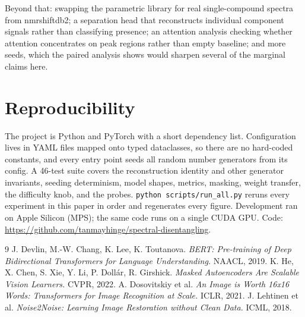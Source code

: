 \documentclass[11pt]{article}
\begin{document}
Beyond that: swapping the parametric library for real single-compound spectra from
nmrshiftdb2; a separation head that reconstructs individual component signals rather than
classifying presence; an attention analysis checking whether attention concentrates on peak
regions rather than empty baseline; and more seeds, which the paired analysis shows would
sharpen several of the marginal claims here.

\section{Reproducibility}

The project is Python and PyTorch with a short dependency list. Configuration lives in YAML
files mapped onto typed dataclasses, so there are no hard-coded constants, and every entry
point seeds all random number generators from its config. A 46-test suite covers the
reconstruction identity and other generator invariants, seeding determinism, model shapes,
metrics, masking, weight transfer, the difficulty knob, and the probes. \texttt{python
scripts/run\_all.py} reruns every experiment in this paper in order and regenerates every
figure. Development ran on Apple Silicon (MPS); the same code runs on a single CUDA GPU.
Code: \url{https://github.com/tanmayhinge/spectral-disentangling}.

\begin{thebibliography}{9}
 J. Devlin, M.-W. Chang, K. Lee, K. Toutanova.
  \emph{BERT: Pre-training of Deep Bidirectional Transformers for Language Understanding.}
  NAACL, 2019.
 K. He, X. Chen, S. Xie, Y. Li, P. Doll\'ar, R. Girshick.
  \emph{Masked Autoencoders Are Scalable Vision Learners.} CVPR, 2022.
 A. Dosovitskiy et al.
  \emph{An Image is Worth 16x16 Words: Transformers for Image Recognition at Scale.}
  ICLR, 2021.
 J. Lehtinen et al.
  \emph{Noise2Noise: Learning Image Restoration without Clean Data.} ICML, 2018.
\end{thebibliography}
\end{document}
